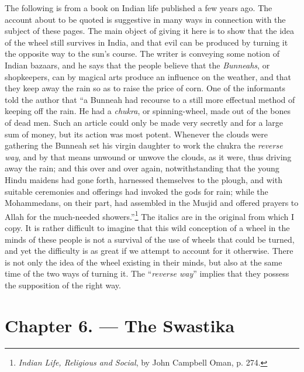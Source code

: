 \documentclass[a4paper, 11pt, oneside, polutonikogreek, english]{article}
\begin{document}
The following is from a book on Indian life published a few years ago. The account about to be quoted is suggestive in many ways in connection with the subject of these pages. The main object of giving it here is to show that the idea of the wheel still survives in India, and that evil can be produced by turning it the opposite way to the sun's course. The writer is conveying some notion of Indian bazaars, and he says that the people believe that the \emph{Bunneahs}, or shopkeepers, can by magical arts produce an influence on the weather, and that they keep away the rain so as to raise the price of corn. One of the informants told the author that ``a Bunneah had recourse to a still more effectual method of keeping off the rain. He had a \emph{chukra}, or spinning-wheel, made out of the bones of dead men. Such an article could only be made very secretly and for a large sum of money, but its action was most potent. Whenever the clouds were gathering the Bunneah set his virgin daughter to work the chukra the \emph{reverse way}, and by that means unwound or unwove the clouds, as it were, thus driving away the rain; and this over and over again, notwithstanding that the young Hindu maidens had gone forth, harnessed themselves to the plough, and with suitable ceremonies and offerings had invoked the gods for rain; while the Mohammedans, on their part, had assembled in the Musjid and offered prayers to Allah for the much-needed showers.''\footnote{\emph{Indian Life, Religious and Social}, by John Campbell Oman, p. 274.} The italics are in the original from which I copy. It is rather difficult to imagine that this wild conception of a wheel in the minds of these people is not a survival of the use of wheels that could be turned, and yet the difficulty is as great if we attempt to account for it otherwise. There is not only the idea of the wheel existing in their minds, but also at the same time of the two ways of turning it. The ``\emph{reverse way}'' implies that they possess the supposition of the right way.
\clearpage
\section{Chapter 6. --- The Swastika}
\end{document}
